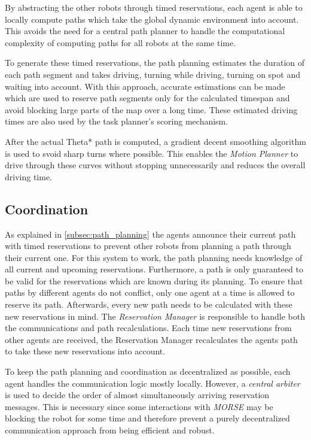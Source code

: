 \documentclass[journal]{IEEEtran}
\newcommand{\compref}[1]{\autoref{#1} \nameref{#1}}
\begin{document}
By abstracting the other robots through timed reservations, each agent is able to locally compute paths which take the global dynamic environment into account. This avoids the need for a central path planner to handle the computational complexity of computing paths for all robots at the same time.

To generate these timed reservations, the path planning estimates the duration of each path segment and takes driving, turning while driving, turning on spot and waiting into account. With this approach, accurate estimations can be made which are used to reserve path segments only for the calculated timespan and avoid blocking large parts of the map over a long time. These estimated driving times are also used by the task planner's scoring mechanism.

After the actual Theta* path is computed, a gradient decent smoothing algorithm is used to svoid sharp turns where possible. This enables the \emph{Motion Planner} to drive through these curves without stopping unnecessarily and reduces the overall driving time.

\subsection{Coordination}
\label{subsec:coordination}
As explained in \compref{subsec:path_planning} the agents announce their current path with timed reservations to prevent other robots from planning a path through their current one. For this system to work, the path planning needs knowledge of all current and upcoming reservations. Furthermore, a path is only guaranteed to be valid for the reservations which are known during its planning. To ensure that paths by different agents do not conflict, only one agent at a time is allowed to reserve its path. Afterwards, every new path needs to be calculated with these new reservations in mind. The \emph{Reservation Manager} is responsible to handle both the communications and path recalculations. Each time new reservations from other agents are received, the Reservation Manager recalculates the agents path to take these new reservations into account.

To keep the path planning and coordination as decentralized as possible, each agent handles the communication logic mostly locally. However, a \emph{central arbiter} is used to decide the order of almost simultaneously arriving reservation messages. This is necessary since some interactions with \emph{MORSE} may be blocking the robot for some time and therefore prevent a purely decentralized communication approach from being efficient and robust.
\end{document}
